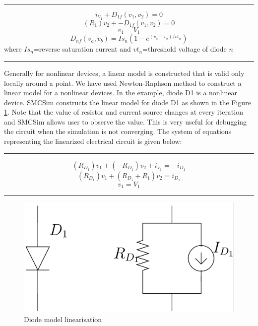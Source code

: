\hrule
\begin{equation}
     i_{V_1} + D_{1f}(v_1,v_2) = 0 
\end{equation}
\begin{equation}
     (R_1)v_2 + -D_{1f}(v_1,v_2) = 0 
\end{equation}
\begin{equation}
     v_1 = V_1
\end{equation}
$$ D_{nf}(v_a,v_b)=Is_n(1-e^{(v_a-v_b)/vt_n})$$
 where $Is_n$=reverse saturation current and $vt_n$=threshold voltage of diode $n$\\
\hrule
\vspace{0.5cm}
Generally for nonlinear devices, a linear model is constructed that is valid only locally around a point. We have used Newton-Raphson method to construct a linear model for a nonlinear devices. In the example, diode D1 is a nonlinear device. SMCSim constructs the linear model for diode D1 as shown in the Figure \ref{lin}. Note that the value of resistor and current source changes at every iteration and SMCSim allows user to observe the value. This is very useful for debugging the circuit when the simulation is not converging. The system of equations representing the linearized electrical circuit is given below:\\ 
\hrule
\begin{equation}
     (R_{D_1})v_1 + (-R_{D_1})v_2 + i_{V_1} = -i_{D_1} 
\end{equation}
\begin{equation}
    (R_{D_1})v_1 + (R_{D_1}+R_1)v_2 = i_{D_1} 
\end{equation}
\begin{equation}
     v_1 = V_1
\end{equation}
\hrule

\begin{figure}[h]%
\begin{center}
\includegraphics[width=0.5\linewidth]{figures/diode-linearization.png}%
\caption{Diode model linearisation}
\label{lin}
\end{center}
\end{figure}




